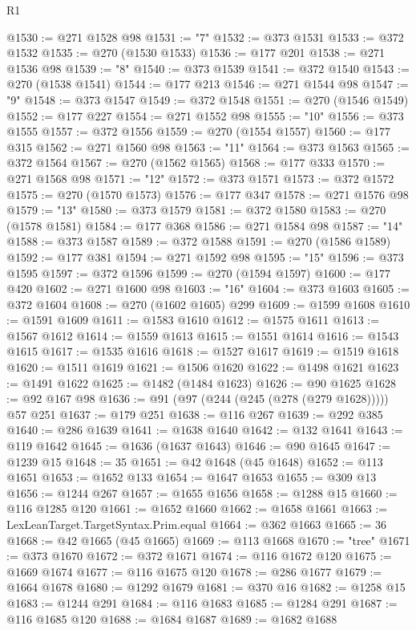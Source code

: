 \begin{lexlean}{R1}
\begin{coremodule}
@1530 := @271 @1528 @98
@1531 := "7"
@1532 := @373 @1531
@1533 := @372 @1532
@1535 := @270 (@1530 @1533)
@1536 := @177 @201
@1538 := @271 @1536 @98
@1539 := "8"
@1540 := @373 @1539
@1541 := @372 @1540
@1543 := @270 (@1538 @1541)
@1544 := @177 @213
@1546 := @271 @1544 @98
@1547 := "9"
@1548 := @373 @1547
@1549 := @372 @1548
@1551 := @270 (@1546 @1549)
@1552 := @177 @227
@1554 := @271 @1552 @98
@1555 := "10"
@1556 := @373 @1555
@1557 := @372 @1556
@1559 := @270 (@1554 @1557)
@1560 := @177 @315
@1562 := @271 @1560 @98
@1563 := "11"
@1564 := @373 @1563
@1565 := @372 @1564
@1567 := @270 (@1562 @1565)
@1568 := @177 @333
@1570 := @271 @1568 @98
@1571 := "12"
@1572 := @373 @1571
@1573 := @372 @1572
@1575 := @270 (@1570 @1573)
@1576 := @177 @347
@1578 := @271 @1576 @98
@1579 := "13"
@1580 := @373 @1579
@1581 := @372 @1580
@1583 := @270 (@1578 @1581)
@1584 := @177 @368
@1586 := @271 @1584 @98
@1587 := "14"
@1588 := @373 @1587
@1589 := @372 @1588
@1591 := @270 (@1586 @1589)
@1592 := @177 @381
@1594 := @271 @1592 @98
@1595 := "15"
@1596 := @373 @1595
@1597 := @372 @1596
@1599 := @270 (@1594 @1597)
@1600 := @177 @420
@1602 := @271 @1600 @98
@1603 := "16"
@1604 := @373 @1603
@1605 := @372 @1604
@1608 := @270 (@1602 @1605) @299
@1609 := @1599 @1608
@1610 := @1591 @1609
@1611 := @1583 @1610
@1612 := @1575 @1611
@1613 := @1567 @1612
@1614 := @1559 @1613
@1615 := @1551 @1614
@1616 := @1543 @1615
@1617 := @1535 @1616
@1618 := @1527 @1617
@1619 := @1519 @1618
@1620 := @1511 @1619
@1621 := @1506 @1620
@1622 := @1498 @1621
@1623 := @1491 @1622
@1625 := @1482 (@1484 @1623)
@1626 := @90 @1625
@1628 := @92 @167 @98
@1636 := @91 (@97 (@244 (@245 (@278 (@279 @1628))))) @57 @251
@1637 := @179 @251
@1638 := @116 @267
@1639 := @292 @385
@1640 := @286 @1639
@1641 := @1638 @1640
@1642 := @132 @1641
@1643 := @119 @1642
@1645 := @1636 (@1637 @1643)
@1646 := @90 @1645
@1647 := @1239 @15
@1648 := 35
@1651 := @42 @1648 (@45 @1648)
@1652 := @113 @1651
@1653 := @1652 @133
@1654 := @1647 @1653
@1655 := @309 @13
@1656 := @1244 @267
@1657 := @1655 @1656
@1658 := @1288 @15
@1660 := @116 @1285 @120
@1661 := @1652 @1660
@1662 := @1658 @1661
@1663 := LexLeanTarget.TargetSyntax.Prim.equal
@1664 := @362 @1663
@1665 := 36
@1668 := @42 @1665 (@45 @1665)
@1669 := @113 @1668
@1670 := "tree"
@1671 := @373 @1670
@1672 := @372 @1671
@1674 := @116 @1672 @120
@1675 := @1669 @1674
@1677 := @116 @1675 @120
@1678 := @286 @1677
@1679 := @1664 @1678
@1680 := @1292 @1679
@1681 := @370 @16
@1682 := @1258 @15
@1683 := @1244 @291
@1684 := @116 @1683
@1685 := @1284 @291
@1687 := @116 @1685 @120
@1688 := @1684 @1687
@1689 := @1682 @1688

\end{coremodule}
\end{lexlean}
